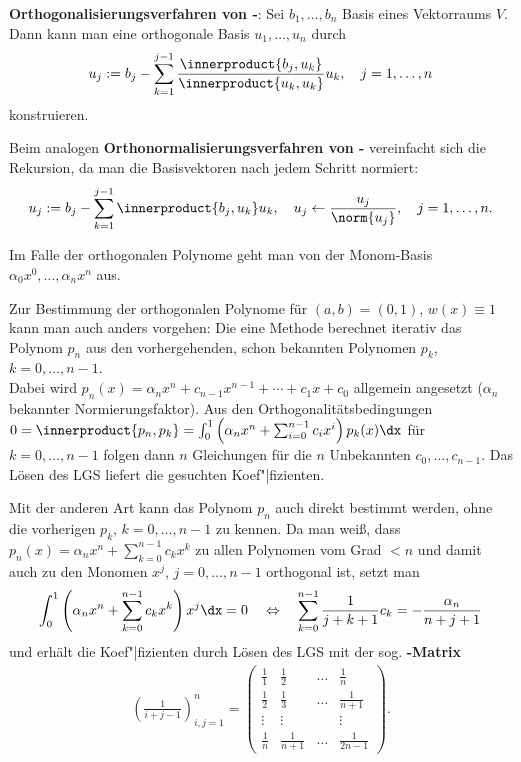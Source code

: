\linie

\textbf{Orthogonalisierungsverfahren von -}:
Sei $b_1, \dotsc, b_n$ Basis eines Vektorraums $V$.
Dann kann man eine orthogonale Basis $u_1, \dotsc, u_n$ durch
\begin{align*}
    u_j := b_j - \sum_{k=1}^{j-1} \frac{\innerproduct{b_j, u_k}}{\innerproduct{u_k, u_k}} u_k,
    \quad j = 1, \dotsc, n
\end{align*}
konstruieren.

Beim analogen
\textbf{Orthonormalisierungsverfahren von -}
vereinfacht sich die Rekursion, da man die Basisvektoren nach jedem Schritt
normiert:
\begin{align*}
    u_j := b_j - \sum_{k=1}^{j-1} \innerproduct{b_j, u_k} u_k, \quad
    u_j \leftarrow \frac{u_j}{\norm{u_j}}, \quad
    j = 1, \dotsc, n.
\end{align*}

Im Falle der orthogonalen Polynome geht man von der Monom-Basis
$\alpha_0 x^0, \dotsc, \alpha_n x^n$ aus.

\linie

Zur Bestimmung der orthogonalen Polynome für $(a, b) = (0, 1)$, $w(x) \equiv 1$
kann man auch anders vorgehen:
Die eine Methode berechnet iterativ das Polynom $p_n$ aus den vorhergehenden,
schon bekannten Polynomen $p_k$, $k = 0, \dotsc, n - 1$. \\
Dabei wird $p_n(x) = \alpha_n x^n + c_{n-1} x^{n-1} + \dotsb + c_1 x + c_0$
allgemein angesetzt ($\alpha_n$ bekannter Normierungsfaktor).
Aus den Orthogonalitätsbedingungen \\
$0 = \innerproduct{p_n, p_k}
= \int_0^1 \left(\alpha_n x^n + \sum_{i=0}^{n-1} c_i x^i\right) p_k(x) \dx$ für
$k = 0, \dotsc, n - 1$ folgen dann $n$ Gleichungen für die $n$ Unbekannten
$c_0, \dotsc, c_{n-1}$.
Das Lösen des LGS liefert die gesuchten Koef"|fizienten.

Mit der anderen Art kann das Polynom $p_n$ auch direkt bestimmt werden,
ohne die vorherigen $p_k$, $k = 0, \dotsc, n - 1$ zu kennen.
Da man weiß, dass $p_n(x) = \alpha_n x^n + \sum_{k=0}^{n-1} c_k x^k$
zu allen Polynomen vom Grad $< n$ und damit auch zu den Monomen $x^j$,
$j = 0, \dotsc, n - 1$ orthogonal ist,
setzt man
\begin{align*}
    \int_0^1 \left(\alpha_n x^n + \sum_{k=0}^{n-1} c_k x^k\right) x^j \dx
    = 0 \quad\Leftrightarrow\quad
    \sum_{k=0}^{n-1} \frac{1}{j + k + 1} c_k = - \frac{\alpha_n}{n + j + 1}
\end{align*}
und erhält die Koef"|fizienten durch Lösen des LGS mit der sog.
\textbf{-Matrix}
\begin{align*}
    \left(\frac{1}{i + j - 1}\right)_{i,j=1}^n =
    \begin{pmatrix}
        \frac{1}{1} & \frac{1}{2} & \dots & \frac{1}{n} \\
        \frac{1}{2} & \frac{1}{3} & \dots & \frac{1}{n + 1} \\
        \vdots & \vdots & & \vdots \\
        \frac{1}{n} & \frac{1}{n + 1} & \dots & \frac{1}{2n - 1}
    \end{pmatrix}.
\end{align*}

